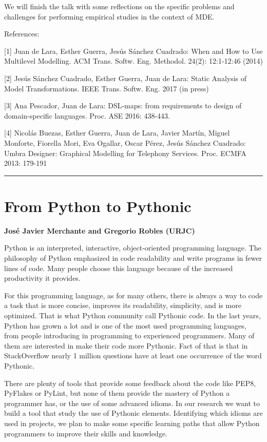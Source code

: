 \documentclass[11pt,pressrelease]{newlfm} %
\begin{document}
\begin{newlfm}
We will finish the talk with some reflections on the specific problems and challenges for performing empirical studies in the context of MDE.
 
References: 

[1] Juan de Lara, Esther Guerra, Jes\'us S\'anchez Cuadrado: When and How to Use Multilevel Modelling. ACM Trans. Softw. Eng. Methodol. 24(2): 12:1-12:46 (2014)

[2] Jes\'us S\'anchez Cuadrado, Esther Guerra, Juan de Lara: Static Analysis of Model Transformations. IEEE Trans. Softw. Eng. 2017 (in press)

[3] Ana Pescador, Juan de Lara: DSL-maps: from requirements to design of domain-specific languages. Proc. ASE 2016: 438-443. 

[4] Nicol\'as Buezas, Esther Guerra, Juan de Lara, Javier Mart\'in, Miguel Monforte, Fiorella Mori, Eva Ogallar, Oscar P\'erez, Jes\'us S\'anchez Cuadrado: Umbra Designer: Graphical Modelling for Telephony Services. Proc. ECMFA 2013: 179-191


\rule{\textwidth}{1pt} \par \noindent
\section{From Python to Pythonic}

{\bf Jos\'e Javier Merchante and Gregorio Robles (URJC)}

Python is an interpreted, interactive, object-oriented programming language. The philosophy of Python emphasized in code readability and write programs in fewer lines of code. Many people choose this language because of the increased productivity it provides.

For this programming language, as for many others, there is always a way to code a task that is more concise, improves its readability, simplicity, and is more optimized. That is what Python community call Pythonic code.
In the last years, Python has grown a lot and is one of the most used programming languages, from people introducing in programming to experienced programmers. Many of them are interested in make their code more Pythonic. Fact of that is that in StackOverflow nearly 1 million questions have at least one occurrence of the word Pythonic.

There are plenty of tools that provide some feedback about the code like PEP8, PyFlakes or PyLint, but none of them provide the mastery of Python a programmer has, or the use of some advanced idioms. In our research we want to build a tool that study the use of Pythonic elements. Identifying which idioms are used in projects, we plan to make some specific learning paths that allow Python programmers to improve their skills and knowledge.



\end{newlfm}
\end{document}
